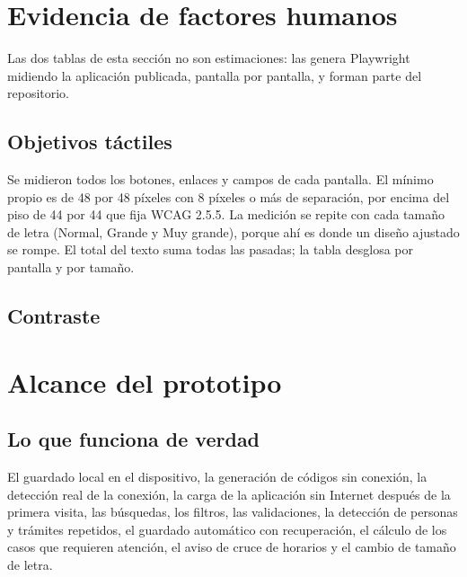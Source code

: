 \documentclass[11pt,a4paper]{article}
\begin{document}


\section{Evidencia de factores humanos}

Las dos tablas de esta sección no son estimaciones: las genera Playwright midiendo la aplicación publicada, pantalla por pantalla, y forman parte del repositorio.

\subsection{Objetivos táctiles}

Se midieron todos los botones, enlaces y campos de cada pantalla. El mínimo propio es de 48 por 48 píxeles con 8 píxeles o más de separación, por encima del piso de 44 por 44 que fija WCAG 2.5.5. La medición se repite con cada tamaño de letra (Normal, Grande y Muy grande), porque ahí es donde un diseño ajustado se rompe. El total del texto suma todas las pasadas; la tabla desglosa por pantalla y por tamaño.





\subsection{Contraste}





\section{Alcance del prototipo}

\subsection{Lo que funciona de verdad}

El guardado local en el dispositivo, la generación de códigos sin conexión, la detección real de la conexión, la carga de la aplicación sin Internet después de la primera visita, las búsquedas, los filtros, las validaciones, la detección de personas y trámites repetidos, el guardado automático con recuperación, el cálculo de los casos que requieren atención, el aviso de cruce de horarios y el cambio de tamaño de letra.
\end{document}
